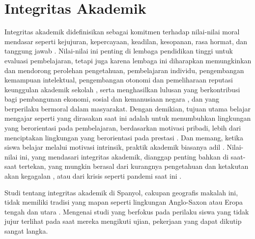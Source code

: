\section{Integritas Akademik}
\label{sec:integritasakademik}

Integritas akademik didefinisikan sebagai komitmen terhadap nilai-nilai moral mendasar seperti kejujuran, kepercayaan, keadilan, kesopanan, rasa hormat, dan tanggung jawab \citet{keohane1999fundamental}. Nilai-nilai ini penting di lembaga pendidikan tinggi untuk evaluasi pembelajaran, tetapi juga karena lembaga ini diharapkan memungkinkan dan mendorong perolehan pengetahuan, pembelajaran individu, pengembangan kemampuan intelektual, pengembangan otonomi dan pemeliharaan reputasi keunggulan akademik sekolah \citep{ahmed2018student} \citep{nuss1984academic}, serta menghasilkan lulusan yang berkontribusi bagi pembangunan ekonomi, sosial dan kemanusiaan negara \citep{muhammad2020factors}, dan yang berperilaku bermoral dalam masyarakat. Dengan demikian, tujuan utama belajar mengajar seperti yang dirasakan saat ini adalah untuk menumbuhkan lingkungan yang berorientasi pada pembelajaran, berdasarkan motivasi pribadi, lebih dari menciptakan lingkungan yang berorientasi pada prestasi \citep{bertram2017academic}. Dan memang, ketika siswa belajar melalui motivasi intrinsik, praktik akademik biasanya adil \citep{barbaranelli2018machiavellian} \citep{krou2020achievement}. Nilai-nilai ini, yang mendasari integritas akademik, dianggap penting bahkan di saat-saat tertekan, yang mungkin berasal dari kurangnya pengetahuan dan ketakutan akan kegagalan \citep{keohane1999fundamental}, atau dari krisis seperti pandemi saat ini \citep{moralista2020faculty}. 

Studi tentang integritas akademik di Spanyol, cakupan geografis makalah ini, tidak memiliki tradisi yang mapan seperti lingkungan Anglo-Saxon atau Eropa tengah dan utara \citep{forgas2009ciberplagio}. Mengenai studi yang berfokus pada perilaku siswa yang tidak jujur terlihat pada saat mereka mengikuti ujian, pekerjaan yang dapat dikutip sangat langka.

